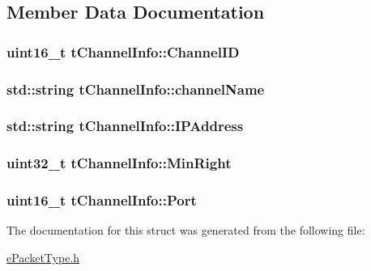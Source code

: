 \subsection{Member Data Documentation}
\subsubsection[{\texorpdfstring{Channel\+ID}{ChannelID}}]{\setlength{\rightskip}{0pt plus 5cm}uint16\+\_\+t t\+Channel\+Info\+::\+Channel\+ID}\hypertarget{structtChannelInfo_a952f04077845c23d1d56ab482b9c51d5}{}\label{structtChannelInfo_a952f04077845c23d1d56ab482b9c51d5}
\subsubsection[{\texorpdfstring{channel\+Name}{channelName}}]{\setlength{\rightskip}{0pt plus 5cm}std\+::string t\+Channel\+Info\+::channel\+Name}\hypertarget{structtChannelInfo_a1841871c10ef7d1965e32e8dc6c6c0fb}{}\label{structtChannelInfo_a1841871c10ef7d1965e32e8dc6c6c0fb}
\subsubsection[{\texorpdfstring{I\+P\+Address}{IPAddress}}]{\setlength{\rightskip}{0pt plus 5cm}std\+::string t\+Channel\+Info\+::\+I\+P\+Address}\hypertarget{structtChannelInfo_af3fd396fc15e5ef4a3f8e8eabfd00402}{}\label{structtChannelInfo_af3fd396fc15e5ef4a3f8e8eabfd00402}
\subsubsection[{\texorpdfstring{Min\+Right}{MinRight}}]{\setlength{\rightskip}{0pt plus 5cm}uint32\+\_\+t t\+Channel\+Info\+::\+Min\+Right}\hypertarget{structtChannelInfo_ae09693212b2dd3dcc06ebb243d9eb019}{}\label{structtChannelInfo_ae09693212b2dd3dcc06ebb243d9eb019}
\subsubsection[{\texorpdfstring{Port}{Port}}]{\setlength{\rightskip}{0pt plus 5cm}uint16\+\_\+t t\+Channel\+Info\+::\+Port}\hypertarget{structtChannelInfo_a053fa692200f6041b754bd5f0a3aa5d5}{}\label{structtChannelInfo_a053fa692200f6041b754bd5f0a3aa5d5}


The documentation for this struct was generated from the following file\+:\begin{DoxyCompactItemize}
\item 
\hyperlink{ePacketType_8h}{e\+Packet\+Type.\+h}\end{DoxyCompactItemize}
